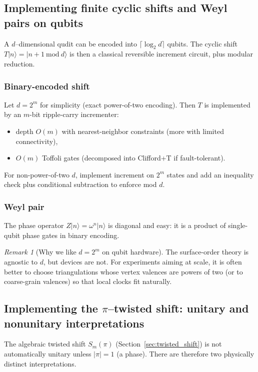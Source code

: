 \documentclass[11pt,oneside]{amsbook}
\numberwithin{equation}{section}
\theoremstyle{plain}
\theoremstyle{definition}
\theoremstyle{remark}
\newtheorem{remark}[theorem]{Remark}
\begin{document}
\subsection{Implementing finite cyclic shifts and Weyl pairs on qubits}
\label{sec:finite_shifts}

A $d$--dimensional qudit can be encoded into $\lceil\log_2 d\rceil$ qubits.
The cyclic shift $T|n\rangle=|n+1\ \mathrm{mod}\ d\rangle$ is then a classical reversible increment circuit, plus modular reduction.

\subsubsection{Binary-encoded shift}
Let $d=2^m$ for simplicity (exact power-of-two encoding).
Then $T$ is implemented by an $m$-bit ripple-carry incrementer:
\begin{itemize}
\item depth $O(m)$ with nearest-neighbor constraints (more with limited connectivity),
\item $O(m)$ Toffoli gates (decomposed into Clifford+T if fault-tolerant).
\end{itemize}

For non-power-of-two $d$, implement increment on $2^m$ states and add an inequality check plus conditional subtraction to enforce mod $d$.

\subsubsection{Weyl pair}
The phase operator $Z|n\rangle=\omega^n|n\rangle$ is diagonal and easy: it is a product of single-qubit phase gates in binary encoding.

\begin{remark}[Why we like $d=2^m$ on qubit hardware]
The surface-order theory is agnostic to $d$, but devices are not.
For experiments aiming at scale, it is often better to choose triangulations whose vertex valences are powers of two (or to coarse-grain valences) so that local clocks fit naturally.
\end{remark}

\subsection{Implementing the $\pi$--twisted shift: unitary and nonunitary interpretations}
\label{sec:twisted_shift_circuits}

The algebraic twisted shift $S_m(\pi)$ (Section~\ref{sec:twisted_shift}) is not automatically unitary unless $|\pi|=1$ (a phase).
There are therefore two physically distinct interpretations.
\end{document}
